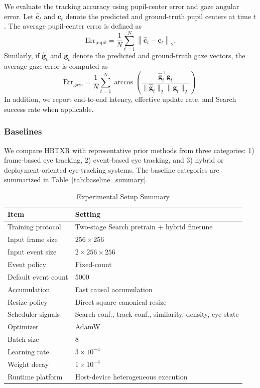 ﻿\documentclass[journal]{IEEEtran}
\begin{document}
We evaluate the tracking accuracy using pupil-center error and gaze angular error. Let \(\hat{\mathbf{c}}_t\) and \(\mathbf{c}_t\) denote the predicted and ground-truth pupil centers at time \(t\). The average pupil-center error is defined as
\begin{equation}
\mathrm{Err}_{\mathrm{pupil}}
=
\frac{1}{N}
\sum_{t=1}^{N}
\left\|
\hat{\mathbf{c}}_t - \mathbf{c}_t
\right\|_2.
\label{eq:pupil_err}
\end{equation}
Similarly, if \(\hat{\mathbf{g}}_t\) and \(\mathbf{g}_t\) denote the predicted and ground-truth gaze vectors, the average gaze error is computed as
\begin{equation}
\mathrm{Err}_{\mathrm{gaze}}
=
\frac{1}{N}
\sum_{t=1}^{N}
\arccos
\left(
\frac{
\hat{\mathbf{g}}_t^\top \mathbf{g}_t
}{
\|\hat{\mathbf{g}}_t\|_2 \|\mathbf{g}_t\|_2
}
\right).
\label{eq:gaze_err}
\end{equation}
In addition, we report end-to-end latency, effective update rate, and Search success rate when applicable.

\subsubsection{Baselines}

We compare HBTXR with representative prior methods from three categories: 1) frame-based eye tracking, 2) event-based eye tracking, and 3) hybrid or deployment-oriented eye-tracking systems. The baseline categories are summarized in Table~\ref{tab:baseline_summary}.

\begin{table}[!t]
\caption{Experimental Setup Summary}
\label{tab:exp_setup}
\centering
\footnotesize
\begin{tabular}{ll}
\toprule
Item & Setting \\
\midrule
Training protocol & Two-stage Search pretrain + hybrid finetune \\
Input frame size & $256 \times 256$ \\
Input event size & $2 \times 256 \times 256$ \\
Event policy & Fixed-count \\
Default event count & 5000 \\
Accumulation & Fast causal accumulation \\
Resize policy & Direct square canonical resize \\
Scheduler signals & Search conf., track conf., similarity, density, eye state \\
Optimizer & AdamW \\
Batch size & 8 \\
Learning rate & $3\times10^{-4}$ \\
Weight decay & $1\times10^{-4}$ \\
Runtime platform & Host-device heterogeneous execution \\
\bottomrule
\end{tabular}
\end{table}
\end{document}
